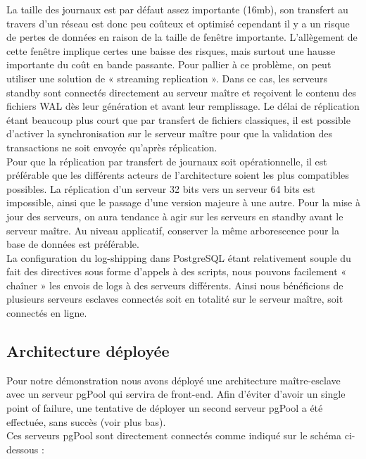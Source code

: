 \documentclass[12pt]{report}
\begin{document}
La taille des journaux est par défaut assez importante (16mb), son transfert au travers d'un
réseau est donc peu coûteux et optimisé cependant il y a un risque de pertes de données
en raison de la taille de fenêtre importante. L'allègement de cette fenêtre implique certes
une baisse des risques, mais surtout une hausse importante du coût en bande passante.
Pour pallier à ce problème, on peut utiliser une solution de « streaming replication ». Dans
ce cas, les serveurs standby sont connectés directement au serveur maître et reçoivent le
contenu des fichiers WAL dès leur génération et avant leur remplissage. Le délai de réplication
étant beaucoup plus court que par transfert de fichiers classiques, il est possible
d’activer la synchronisation sur le serveur maître pour que la validation des
transactions ne soit envoyée qu’après réplication. \\

Pour que la réplication par transfert de journaux soit opérationnelle, il est préférable
que les différents acteurs de l’architecture soient les plus compatibles
possibles. La réplication d’un serveur 32 bits vers un serveur 64 bits est
impossible, ainsi que le passage d’une version majeure à une autre. Pour la mise
à jour des serveurs, on aura tendance à agir sur les serveurs en standby avant
le serveur maître. Au niveau applicatif, conserver la même arborescence pour la
base de données est préférable. \\

La configuration du log-shipping dans PostgreSQL étant relativement souple du
fait des directives sous forme d'appels à des scripts, nous pouvons facilement «
  chaîner » les envois de logs à des serveurs différents. Ainsi nous bénéficions de
plusieurs serveurs esclaves connectés soit en totalité sur le serveur maître,
soit connectés en ligne. \\


\subsection{Architecture déployée}

Pour notre démonstration nous avons déployé une architecture maître-esclave avec
un serveur pgPool qui servira de front-end. Afin d'éviter d'avoir un single
point of failure, une tentative de déployer un second serveur pgPool a été
effectuée, sans succès (voir plus bas). \\

Ces serveurs pgPool sont directement connectés comme indiqué sur le schéma
ci-dessous : \\
\end{document}
